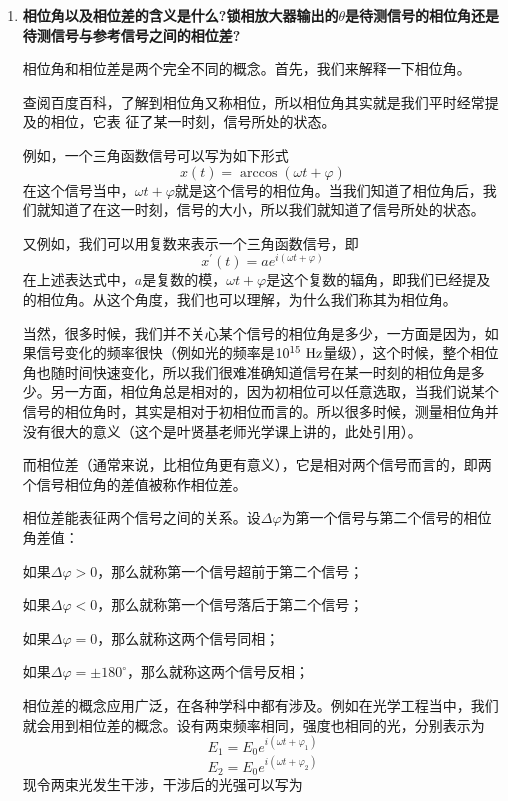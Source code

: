 \documentclass[11pt,a4paper]{ctexart}
\newcommand{\beq}{\begin{equation}}
\newcommand{\eeq}{\end{equation}}
\newcommand{\unit}[1]{\rm \ #1}
\begin{document}
\begin{enumerate}
\begin{enumerate}
 \end{enumerate}
 \item {\bf 相位角以及相位差的含义是什么?锁相放大器输出的$\theta$是待测信号的相位角还是待测信号与参考信号之间的相位差?}\par
相位角和相位差是两个完全不同的概念。首先，我们来解释一下相位角。
\par
查阅百度百科\cite{phasebaidu}，了解到相位角又称相位，所以相位角其实就是我们平时经常提及的相位，它表 征了某一时刻，信号所处的状态。\par
例如，一个三角函数信号可以写为如下形式
\beq
x(t)=\operatorname{arccos}(\omega t+\varphi)
\eeq
在这个信号当中，$\omega t + \varphi$就是这个信号的相位角。当我们知道了相位角后，我们就知道了在这一时刻，信号的大小，所以我们就知道了信号所处的状态。
\par
又例如，我们可以用复数来表示一个三角函数信号，即
\beq
x^{\prime}(t)=a e^{i(\omega t+\varphi)}
\eeq
在上述表达式中，$𝑎$是复数的模，$\omega 𝑡 + \varphi$是这个复数的辐角，即我们已经提及的相位角。从这个角度，我们也可以理解，为什么我们称其为相位角。
\par
当然，很多时候，我们并不关心某个信号的相位角是多少，一方面是因为，如果信号变化的频率很快（例如光的频率是$10^{15}\unit{Hz}$量级），这个时候，整个相位角也随时间快速变化，所以我们很难准确知道信号在某一时刻的相位角是多少。另一方面，相位角总是相对的，因为初相位可以任意选取，当我们说某个信号的相位角时，其实是相对于初相位而言的。所以很多时候，测量相位角并没有很大的意义（这个是叶贤基老师光学课上讲的，此处引用）。
\par
而相位差（通常来说，比相位角更有意义），它是相对两个信号而言的，即两个信号相位角的差值被称作相位差。
\par
相位差能表征两个信号之间的关系。设$\Delta \varphi$为第一个信号与第二个信号的相位角差值：
\par
如果$\Delta \varphi>0$，那么就称第一个信号超前于第二个信号；
\par
如果$\Delta \varphi<0$，那么就称第一个信号落后于第二个信号；
\par
如果$\Delta \varphi=0$，那么就称这两个信号同相；
\par
如果$\Delta \varphi=\pm 180^{\circ}$，那么就称这两个信号反相；
\par
相位差的概念应用广泛，在各种学科中都有涉及。例如在光学\cite{ced,dtem}工程当中，我们就会用到相位差的概念。设有两束频率相同，强度也相同的光，分别表示为
\beq \label{38}
E_{1}=E_{0} e^{i\left(\omega t+\varphi_{1}\right)}
\eeq
\beq \label{39}
E_{2}=E_{0} e^{i\left(\omega t+\varphi_{2}\right)}
\eeq
现令两束光发生干涉，干涉后的光强可以写为

\end{enumerate}
\end{document}

